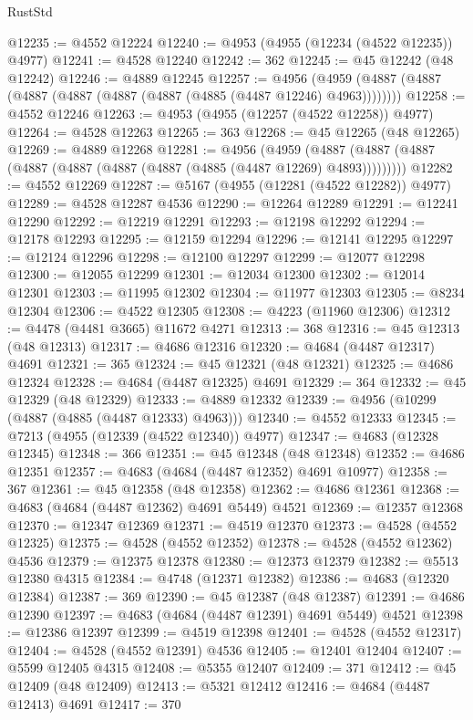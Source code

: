 \begin{lexlean}{RustStd}
\begin{coremodule}
@12235 := @4552 @12224
@12240 := @4953 (@4955 (@12234 (@4522 @12235)) @4977)
@12241 := @4528 @12240
@12242 := 362
@12245 := @45 @12242 (@48 @12242)
@12246 := @4889 @12245
@12257 := @4956 (@4959 (@4887 (@4887 (@4887 (@4887 (@4887 (@4887 (@4885 (@4487 @12246) @4963))))))))
@12258 := @4552 @12246
@12263 := @4953 (@4955 (@12257 (@4522 @12258)) @4977)
@12264 := @4528 @12263
@12265 := 363
@12268 := @45 @12265 (@48 @12265)
@12269 := @4889 @12268
@12281 := @4956
    (@4959 (@4887 (@4887 (@4887 (@4887 (@4887 (@4887 (@4887 (@4885 (@4487 @12269) @4893)))))))))
@12282 := @4552 @12269
@12287 := @5167 (@4955 (@12281 (@4522 @12282)) @4977)
@12289 := @4528 @12287 @4536
@12290 := @12264 @12289
@12291 := @12241 @12290
@12292 := @12219 @12291
@12293 := @12198 @12292
@12294 := @12178 @12293
@12295 := @12159 @12294
@12296 := @12141 @12295
@12297 := @12124 @12296
@12298 := @12100 @12297
@12299 := @12077 @12298
@12300 := @12055 @12299
@12301 := @12034 @12300
@12302 := @12014 @12301
@12303 := @11995 @12302
@12304 := @11977 @12303
@12305 := @8234 @12304
@12306 := @4522 @12305
@12308 := @4223 (@11960 @12306)
@12312 := @4478 (@4481 @3665) @11672 @4271
@12313 := 368
@12316 := @45 @12313 (@48 @12313)
@12317 := @4686 @12316
@12320 := @4684 (@4487 @12317) @4691
@12321 := 365
@12324 := @45 @12321 (@48 @12321)
@12325 := @4686 @12324
@12328 := @4684 (@4487 @12325) @4691
@12329 := 364
@12332 := @45 @12329 (@48 @12329)
@12333 := @4889 @12332
@12339 := @4956 (@10299 (@4887 (@4885 (@4487 @12333) @4963)))
@12340 := @4552 @12333
@12345 := @7213 (@4955 (@12339 (@4522 @12340)) @4977)
@12347 := @4683 (@12328 @12345)
@12348 := 366
@12351 := @45 @12348 (@48 @12348)
@12352 := @4686 @12351
@12357 := @4683 (@4684 (@4487 @12352) @4691 @10977)
@12358 := 367
@12361 := @45 @12358 (@48 @12358)
@12362 := @4686 @12361
@12368 := @4683 (@4684 (@4487 @12362) @4691 @5449) @4521
@12369 := @12357 @12368
@12370 := @12347 @12369
@12371 := @4519 @12370
@12373 := @4528 (@4552 @12325)
@12375 := @4528 (@4552 @12352)
@12378 := @4528 (@4552 @12362) @4536
@12379 := @12375 @12378
@12380 := @12373 @12379
@12382 := @5513 @12380 @4315
@12384 := @4748 (@12371 @12382)
@12386 := @4683 (@12320 @12384)
@12387 := 369
@12390 := @45 @12387 (@48 @12387)
@12391 := @4686 @12390
@12397 := @4683 (@4684 (@4487 @12391) @4691 @5449) @4521
@12398 := @12386 @12397
@12399 := @4519 @12398
@12401 := @4528 (@4552 @12317)
@12404 := @4528 (@4552 @12391) @4536
@12405 := @12401 @12404
@12407 := @5599 @12405 @4315
@12408 := @5355 @12407
@12409 := 371
@12412 := @45 @12409 (@48 @12409)
@12413 := @5321 @12412
@12416 := @4684 (@4487 @12413) @4691
@12417 := 370

\end{coremodule}
\end{lexlean}
